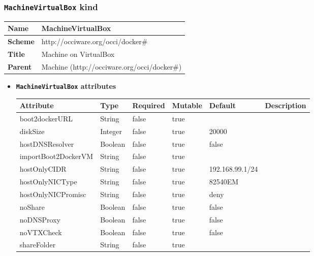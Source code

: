 \subsubsection{\texttt{MachineVirtualBox} kind}
\begin{center}
\begin{tabular}{|l|l|}
  \hline
  \textbf{Name} & MachineVirtualBox \\
  \hline  
  \textbf{Scheme} & http://occiware.org/occi/docker\# \\
  \hline
  \textbf{Title} & Machine on VirtualBox \\
  \hline
  \textbf{Parent} & Machine (http://occiware.org/occi/docker\#) \\
  \hline
\end{tabular}
\end{center}
\begin{itemize}
\item \textbf{\texttt{MachineVirtualBox} attributes}

\begin{tabularx}{\textwidth}{|l|l|p{1.4cm}|p{1.3cm}|l|X|}
  \hline
  \textbf{Attribute} & \textbf{Type} & \textbf{Required} & \textbf{Mutable} & \textbf{Default} & \textbf{Description} \\
  \hline  
  boot2dockerURL & String & false & true &  &  \\
  \hline
  diskSize & Integer & false & true & 20000 &  \\
  \hline
  hostDNSResolver & Boolean & false & true & false &  \\
  \hline
  importBoot2DockerVM & String & false & true &  &  \\
  \hline
  hostOnlyCIDR & String & false & true & 192.168.99.1/24 &  \\
  \hline
  hostOnlyNICType & String & false & true & 82540EM &  \\
  \hline
  hostOnlyNICPromisc & String & false & true & deny &  \\
  \hline
  noShare & Boolean & false & true & false &  \\
  \hline
  noDNSProxy & Boolean & false & true & false &  \\
  \hline
  noVTXCheck & Boolean & false & true & false &  \\
  \hline
  shareFolder & String & false & true &  &  \\
  \hline
\end{tabularx}
\end{itemize}



